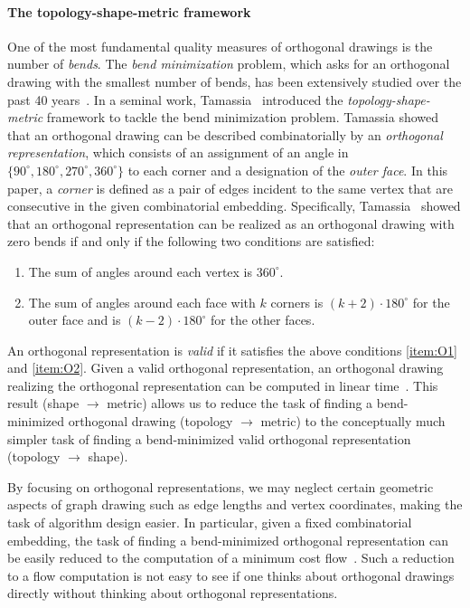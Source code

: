 \documentclass{theoretics}
\begin{document}
\paragraph{The topology-shape-metric framework}
One of the most fundamental quality measures of orthogonal drawings is the number of \emph{bends}.
The \emph{bend minimization} problem, which asks for an orthogonal drawing with the smallest number of bends, has been extensively studied over the past 40 years~\cite{CK12,BLV98,didimo2020optimal,GT96,storer1980node,tamassia1987embedding}.
In a seminal work, Tamassia~\cite{tamassia1987embedding} introduced the \emph{topology-shape-metric} framework to tackle the bend minimization problem.  Tamassia showed that an orthogonal drawing can be described combinatorially by an \emph{orthogonal representation}, which consists of an assignment of an angle in $\{90^\circ, 180^\circ, 270^\circ, 360^\circ\}$ to each corner and a designation of the \emph{outer face}. In this paper, a \emph{corner} is defined as a pair of edges incident to the same vertex that are consecutive in the given combinatorial embedding. Specifically, Tamassia~\cite{tamassia1987embedding} showed that an orthogonal representation can be realized as an orthogonal drawing with zero bends if and only if the following two conditions are satisfied:
\begin{enumerate}[(O1)]
    \item \label{item:O1} The sum of angles around each vertex is $360^\circ$.
    \item \label{item:O2} The sum of angles around each face with $k$ corners is $(k+2)\cdot 180^\circ$ for the outer face and is $(k-2)\cdot 180^\circ$ for the other faces.
\end{enumerate}


An orthogonal representation is \emph{valid} if it satisfies the above conditions \ref{item:O1} and \ref{item:O2}. Given a valid orthogonal representation, an orthogonal drawing realizing the orthogonal representation can be computed in linear time~\cite{hsueh1980symbolic,tamassia1987embedding}. 
This result (shape $\rightarrow$ metric) allows us to reduce the task of finding a bend-minimized orthogonal drawing (topology $\rightarrow$ metric) to the conceptually much simpler task of finding a bend-minimized valid orthogonal representation (topology $\rightarrow$ shape). 

By focusing on orthogonal representations, we may neglect certain geometric aspects of graph drawing such as edge lengths and vertex coordinates, making the task of algorithm design easier. In particular, given a fixed combinatorial embedding, the task of finding a bend-minimized orthogonal representation can be easily reduced to the  computation of a minimum cost flow~\cite{tamassia1987embedding}. Such a reduction to a flow computation is not easy to see if one thinks about orthogonal drawings directly without thinking about orthogonal representations. 
\end{document}
